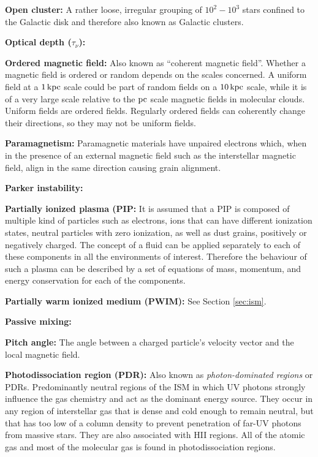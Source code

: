 \documentclass[a4paper,10pt]{article}
\begin{document}
{\noindent}\textbf{Open cluster:} A rather loose, irregular grouping of $10^2-10^3$ stars confined to the Galactic disk and therefore also known as Galactic clusters. 

{\noindent}\textbf{Optical depth ($\tau_\nu$):} 

{\noindent}\textbf{Ordered magnetic field:} Also known as ``coherent magnetic field''. Whether a magnetic field is ordered or random depends on the scales concerned. A uniform field at a $1\,{\rm kpc}$ scale could be part of random fields on a $10\,{\rm kpc}$ scale, while it is of a very large scale relative to the $\rm pc$ scale magnetic fields in molecular clouds. Uniform fields are ordered fields. Regularly ordered fields can coherently change their directions, so they may not be uniform fields. 

{\noindent}\textbf{Paramagnetism:} Paramagnetic materials have unpaired electrons which, when in the presence of an external magnetic field such as the interstellar magnetic field, align in the same direction causing grain alignment.

{\noindent}\textbf{Parker instability:}

{\noindent}\textbf{Partially ionized plasma (PIP:} It is assumed that a PIP is composed of multiple kind of particles such as electrons, ions that can have different ionization states, neutral particles with zero ionization, as well as dust grains, positively or negatively charged. The concept of a fluid can be applied separately to each of these components in all the environments of interest. Therefore the behaviour of such a plasma can be described by a set of equations of mass, momentum, and energy conservation for each of the components. 

{\noindent}\textbf{Partially warm ionized medium (PWIM):} See Section \ref{sec:ism}. 

{\noindent}\textbf{Passive mixing:}

{\noindent}\textbf{Pitch angle:} The angle between a charged particle's velocity vector and the local magnetic field.

{\noindent}\textbf{Photodissociation region (PDR):} Also known as \textit{photon-dominated regions} or PDRs. Predominantly neutral regions of the ISM in which UV photons strongly influence the gas chemistry and act as the dominant energy source. They occur in any region of interstellar gas that is dense and cold enough to remain neutral, but that has too low of a column density to prevent penetration of far-UV photons from massive stars. They are also associated with HII regions. All of the atomic gas and most of the molecular gas is found in photodissociation regions.
\end{document}
